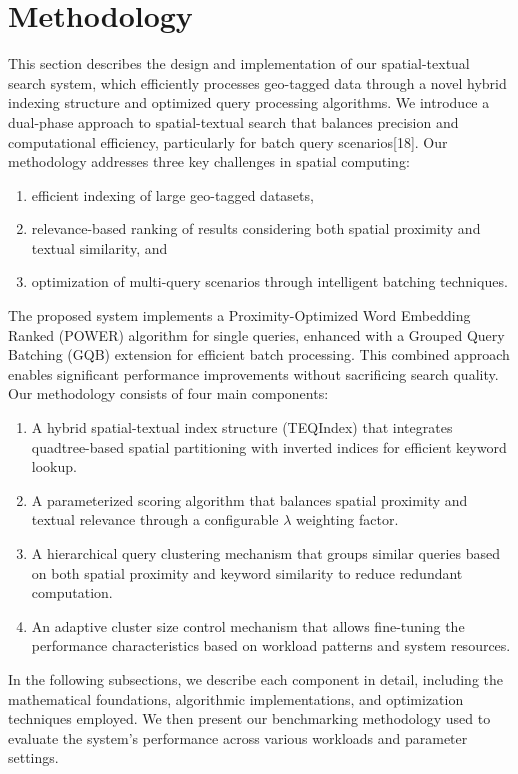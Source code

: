\documentclass[conference]{IEEEtran}
\begin{document}
\section{Methodology}
This section describes the design and implementation of our spatial-textual search system, which efficiently processes geo-tagged data through a novel hybrid indexing structure and optimized query processing algorithms. We introduce a dual-phase approach to spatial-textual search that balances precision and computational efficiency, particularly for batch query scenarios[18].
Our methodology addresses three key challenges in spatial computing: 
\begin{enumerate}
    \item efficient indexing of large geo-tagged datasets,
    \item relevance-based ranking of results considering both spatial proximity and textual similarity, and
    \item optimization of multi-query scenarios through intelligent batching techniques.
\end{enumerate}
The proposed system implements a Proximity-Optimized Word Embedding Ranked (POWER) algorithm for single queries, enhanced with a Grouped Query Batching (GQB) extension for efficient batch processing. This combined approach enables significant performance improvements without sacrificing search quality. Our methodology consists of four main components:
\begin{enumerate}
    \item A hybrid spatial-textual index structure (TEQIndex) that integrates quadtree-based spatial partitioning with inverted indices for efficient keyword lookup.\
    \item A parameterized scoring algorithm that balances spatial proximity and textual relevance through a configurable \(\lambda\) weighting factor.
    \item A hierarchical query clustering mechanism that groups similar queries based on both spatial proximity and keyword similarity to reduce redundant computation.
    \item An adaptive cluster size control mechanism that allows fine-tuning the performance characteristics based on workload patterns and system resources.
\end{enumerate}
In the following subsections, we describe each component in detail, including the mathematical foundations, algorithmic implementations, and optimization techniques employed. We then present our benchmarking methodology used to evaluate the system's performance across various workloads and parameter settings.
\end{document}

